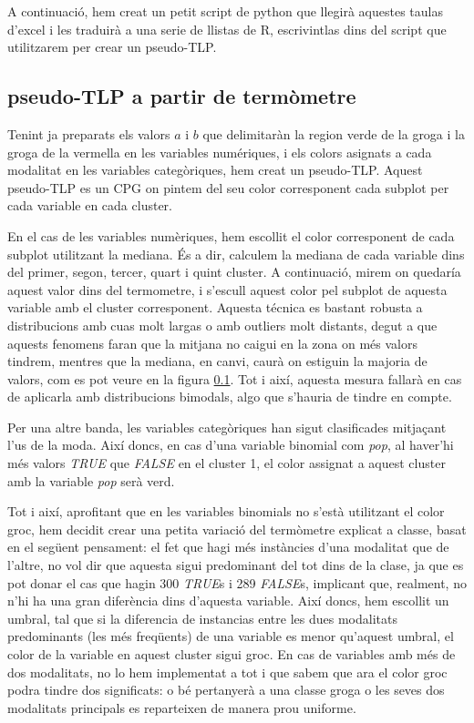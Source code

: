 \documentclass{article}
\begin{document}

A continuació, hem creat un petit script de python que llegirà aquestes taulas d'excel i les traduirà a una serie de llistas de R, escrivintlas dins del script que utilitzarem per crear un pseudo-TLP.


\subsection{pseudo-TLP a partir de termòmetre}

Tenint ja preparats els valors $a$ i $b$ que delimitaràn la region verde de la groga i la groga de la vermella en les variables numériques, i els colors asignats a cada modalitat en les variables categòriques, hem creat un pseudo-TLP. Aquest pseudo-TLP es un CPG on pintem del seu color corresponent cada subplot per cada variable en cada cluster.

En el cas de les variables numèriques, hem escollit el color corresponent de cada subplot utilitzant la mediana. És a dir, calculem la mediana de cada variable dins del primer, segon, tercer, quart i quint cluster. A continuació, mirem on quedaría aquest valor dins del termometre, i s'escull aquest color pel subplot de aquesta variable amb el cluster corresponent. Aquesta técnica es bastant robusta a distribucions amb cuas molt largas o amb outliers molt distants, degut a que aquests fenomens faran que la mitjana no caigui en la zona on més valors tindrem, mentres que la mediana, en canvi, caurà on estiguin la majoria de valors, com es pot veure en la figura \ref{}. Tot i així, aquesta mesura fallarà en cas de aplicarla amb distribucions bimodals, algo que s'hauria de tindre en compte.

Per una altre banda, les variables categòriques han sigut clasificades mitjaçant l'us de la moda. Així doncs, en cas d'una variable binomial com \textit{pop}, al haver'hi més valors \textit{TRUE} que \textit{FALSE} en el cluster 1, el color assignat a aquest cluster amb la variable \textit{pop} serà verd.

Tot i així, aprofitant que en les variables binomials no s'està utilitzant el color groc, hem decidit crear una petita variació del termòmetre explicat a classe, basat en el següent pensament: el fet que hagi més instàncies d'una modalitat que de l'altre, no vol dir que aquesta sigui predominant del tot dins de la clase, ja que es pot donar el cas que hagin 300 \textit{TRUE}s i 289 \textit{FALSE}s, implicant que, realment, no n'hi ha una gran diferència dins d'aquesta variable. Així doncs, hem escollit un umbral, tal que si la diferencia de instancias entre les dues modalitats predominants (les més freqüents) de una variable es menor qu'aquest umbral, el color de la variable en aquest cluster sigui groc. En cas de variables amb més de dos modalitats, no lo hem implementat a tot i que sabem que ara el color groc podra tindre dos significats: o bé pertanyerà a una classe groga o les seves dos modalitats principals es reparteixen de manera prou uniforme.
\end{document}
